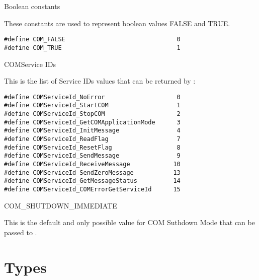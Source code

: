 \begin{constant}{Boolean constants}
\label{subsec:const_bool}
  \begin{constantdescription}
    These constants are used to represent boolean values FALSE and TRUE.
    \begin {lstlisting}
#define COM_FALSE                               0
#define COM_TRUE                                1
    \end{lstlisting}
  \end{constantdescription}
\end{constant}

\begin{constant}{COMService IDs}
  \begin{constantdescription}
    This is the list of Service IDs values that can be returned by
    :
    \begin {lstlisting}
#define COMServiceId_NoError                    0
#define COMServiceId_StartCOM                   1
#define COMServiceId_StopCOM                    2
#define COMServiceId_GetCOMApplicationMode      3
#define COMServiceId_InitMessage                4
#define COMServiceId_ReadFlag                   7
#define COMServiceId_ResetFlag                  8
#define COMServiceId_SendMessage                9
#define COMServiceId_ReceiveMessage            10
#define COMServiceId_SendZeroMessage           13
#define COMServiceId_GetMessageStatus          14
#define COMServiceId_COMErrorGetServiceId      15

    \end{lstlisting}
  \end{constantdescription}
\end{constant}

\begin{constant}{COM\_SHUTDOWN\_IMMEDIATE}
  \begin{constantdescription}
    This is the default and only possible value for COM Suthdown Mode that can 
    be passed to .
  \end{constantdescription}
\end{constant}

\pagebreak




\section{Types}
\label{sec:types}

